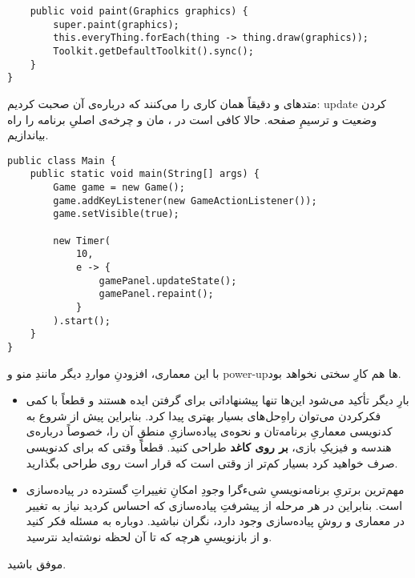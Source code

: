 \documentclass[a4paper,12pt]{paper}
\newcommand{\minti}[1]{\roundbox{\lr{\texttt{#1}}}}
\begin{document}
\begin{verbatim}
	public void paint(Graphics graphics) {
		super.paint(graphics);
		this.everyThing.forEach(thing -> thing.draw(graphics));
		Toolkit.getDefaultToolkit().sync();
	}
}
\end{verbatim}

متد‌های \minti{.updateState} و \minti{.paint} دقیقاً همان کاری را می‌کنند که درباره‌ی آن صحبت کردیم: {\en update} کردن وضعیت و ترسیمِ صفحه. حالا کافی است در \minti{Main}، \minti{Timer}مان و چرخه‌ی اصلیِ برنامه را راه بیاندازیم.
\begin{verbatim}
public class Main {
	public static void main(String[] args) {
		Game game = new Game();
		game.addKeyListener(new GameActionListener());
		game.setVisible(true);
		
		new Timer(
			10,
			e -> {
				gamePanel.updateState();
				gamePanel.repaint();
			}
		).start();		
	}
}
\end{verbatim}
با این معماری، افزودنِ مواردِ دیگر مانندِ منو و {\en power-up}ها هم کارِ سختی نخواهد بود.

\begin{attn}
	\begin{itemize}
		\item
		بارِ دیگر تأکید می‌شود این‌ها تنها پیشنهاداتی برای گرفتن ایده هستند و قطعاً با کمی فکرکردن می‌توان راهِ‌حل‌های بسیار بهتری پیدا کرد. بنابراین پیش از شروع به کدنویسی معماریِ برنامه‌تان و نحوه‌ی پیاده‌سازیِ منطقِ آن را، خصوصاً درباره‌ی هندسه و فیزیکِ بازی، \textbf{بر روی کاغد} طراحی کنید. قطعاً وقتی که برای کدنویسی صرف خواهید کرد بسیار کم‌تر از وقتی است که قرار است روی طراحی بگذارید.
		\item
			مهم‌ترین برتریِ برنامه‌نویسیِ شیءگرا وجودِ امکانِ تغییراتِ گسترده در پیاده‌سازی است. بنابراین در هر مرحله از پیشرفتِ پیاده‌سازی که احساس کردید نیاز به تغییر در معماری و روشِ پیاده‌سازی وجود دارد، نگران نباشید. دوباره به مسئله فکر کنید و از بازنویسیِ هرچه که تا آن لحظه نوشته‌اید نترسید.
	\end{itemize}
\end{attn}
موفق باشید.
\end{document}
